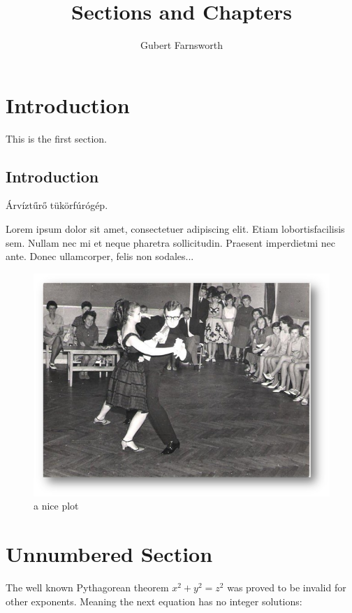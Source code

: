 \documentclass{article}
\title{Sections and Chapters}
\author{Gubert Farnsworth}
\date{ }
\begin{document}
  
\maketitle

\tableofcontents

\section{Introduction}
   
This is the first section.

\subsection{Introduction}
Árvíztűrő tükörfúrógép.

Lorem  ipsum  dolor  sit  amet,  consectetuer  adipiscing  
elit.   Etiam  lobortisfacilisis sem.  Nullam nec mi et 
neque pharetra sollicitudin.  Praesent imperdietmi nec ante. 
Donec ullamcorper, felis non sodales...

\begin{figure}[h]
    \centering
    \includegraphics[scale=0.6]{joskabacsi}
    \caption{a nice plot}
    \label{fig:mesh1}
\end{figure}

\section*{Unnumbered Section}

The well known Pythagorean theorem \(x^2 + y^2 = z^2\) was 
proved to be invalid for other exponents. 
Meaning the next equation has no integer solutions:
\end{document}
